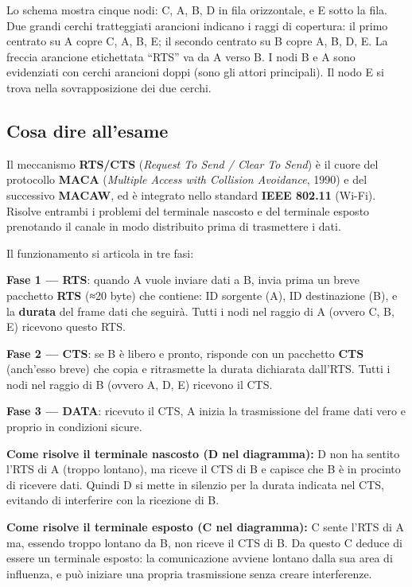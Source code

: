 \documentclass[
  italian,
  openany]{book}
\begin{document}
Lo schema mostra cinque nodi: C, A, B, D in fila orizzontale, e E sotto
la fila. Due grandi cerchi tratteggiati arancioni indicano i raggi di
copertura: il primo centrato su A copre C, A, B, E; il secondo centrato
su B copre A, B, D, E. La freccia arancione etichettata ``RTS'' va da A
verso B. I nodi B e A sono evidenziati con cerchi arancioni doppi (sono
gli attori principali). Il nodo E si trova nella sovrapposizione dei due
cerchi.

\subsection{Cosa dire all'esame}\label{cosa-dire-allesame-2}

Il meccanismo \textbf{RTS/CTS} (\emph{Request To Send / Clear To Send})
è il cuore del protocollo \textbf{MACA} (\emph{Multiple Access with
Collision Avoidance}, 1990) e del successivo \textbf{MACAW}, ed è
integrato nello standard \textbf{IEEE 802.11} (Wi-Fi). Risolve entrambi
i problemi del terminale nascosto e del terminale esposto prenotando il
canale in modo distribuito prima di trasmettere i dati.

Il funzionamento si articola in tre fasi:

\textbf{Fase 1 --- RTS}: quando A vuole inviare dati a B, invia prima un
breve pacchetto \textbf{RTS} (≈20 byte) che contiene: ID sorgente (A),
ID destinazione (B), e la \textbf{durata} del frame dati che seguirà.
Tutti i nodi nel raggio di A (ovvero C, B, E) ricevono questo RTS.

\textbf{Fase 2 --- CTS}: se B è libero e pronto, risponde con un
pacchetto \textbf{CTS} (anch'esso breve) che copia e ritrasmette la
durata dichiarata dall'RTS. Tutti i nodi nel raggio di B (ovvero A, D,
E) ricevono il CTS.

\textbf{Fase 3 --- DATA}: ricevuto il CTS, A inizia la trasmissione del
frame dati vero e proprio in condizioni sicure.

\textbf{Come risolve il terminale nascosto (D nel diagramma):} D non ha
sentito l'RTS di A (troppo lontano), ma riceve il CTS di B e capisce che
B è in procinto di ricevere dati. Quindi D si mette in silenzio per la
durata indicata nel CTS, evitando di interferire con la ricezione di B.

\textbf{Come risolve il terminale esposto (C nel diagramma):} C sente
l'RTS di A ma, essendo troppo lontano da B, non riceve il CTS di B. Da
questo C deduce di essere un terminale esposto: la comunicazione avviene
lontano dalla sua area di influenza, e può iniziare una propria
trasmissione senza creare interferenze.
\end{document}
